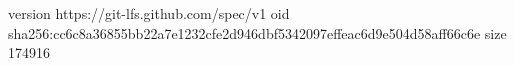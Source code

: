 version https://git-lfs.github.com/spec/v1
oid sha256:cc6c8a36855bb22a7e1232cfe2d946dbf5342097effeac6d9e504d58aff66c6e
size 174916
